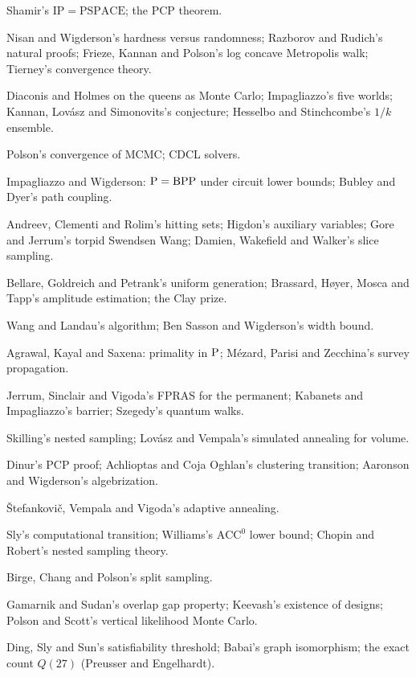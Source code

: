 \begin{description}[style=nextline]
\item[1992] Shamir's $\mathrm{IP} = \mathrm{PSPACE}$; the PCP theorem.
\item[1994] Nisan and Wigderson's hardness versus randomness; Razborov and Rudich's natural proofs; Frieze, Kannan and Polson's log concave Metropolis walk; Tierney's convergence theory.
\item[1995] Diaconis and Holmes on the queens as Monte Carlo; Impagliazzo's five worlds; Kannan, Lov\'asz and Simonovits's conjecture; Hesselbo and Stinchcombe's $1/k$ ensemble.
\item[1996] Polson's convergence of MCMC; CDCL solvers.
\item[1997] Impagliazzo and Wigderson: $\mathrm{P} = \mathrm{BPP}$ under circuit lower bounds; Bubley and Dyer's path coupling.
\item[1998 to 1999] Andreev, Clementi and Rolim's hitting sets; Higdon's auxiliary variables; Gore and Jerrum's torpid Swendsen Wang; Damien, Wakefield and Walker's slice sampling.
\item[2000] Bellare, Goldreich and Petrank's uniform generation; Brassard, H{\o}yer, Mosca and Tapp's amplitude estimation; the Clay prize.
\item[2001] Wang and Landau's algorithm; Ben Sasson and Wigderson's width bound.
\item[2002] Agrawal, Kayal and Saxena: primality in $\mathrm{P}$; M\'ezard, Parisi and Zecchina's survey propagation.
\item[2004] Jerrum, Sinclair and Vigoda's FPRAS for the permanent; Kabanets and Impagliazzo's barrier; Szegedy's quantum walks.
\item[2006] Skilling's nested sampling; Lov\'asz and Vempala's simulated annealing for volume.
\item[2007 to 2008] Dinur's PCP proof; Achlioptas and Coja Oghlan's clustering transition; Aaronson and Wigderson's algebrization.
\item[2009] \v{S}tefankovi\v{c}, Vempala and Vigoda's adaptive annealing.
\item[2010 to 2011] Sly's computational transition; Williams's $\mathrm{ACC}^0$ lower bound; Chopin and Robert's nested sampling theory.
\item[2013] Birge, Chang and Polson's split sampling.
\item[2014] Gamarnik and Sudan's overlap gap property; Keevash's existence of designs; Polson and Scott's vertical likelihood Monte Carlo.
\item[2015 to 2016] Ding, Sly and Sun's satisfiability threshold; Babai's graph isomorphism; the exact count $Q(27)$ (Preusser and Engelhardt).

\end{description}
